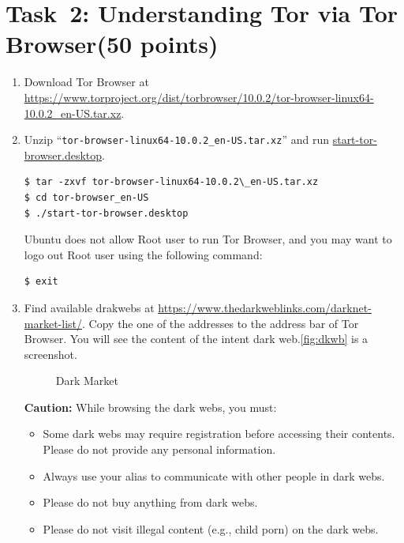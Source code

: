 \documentclass[11pt]{article}
\newcommand{\tor}{{\sf Tor}\xspace}
\newcommand{\torbw}{{\sf Tor Browser}\xspace}
\begin{document}
\section{Task~2: Understanding \tor via \torbw (50 points)} 
\begin{enumerate}
\item Download \torbw at \url{https://www.torproject.org/dist/torbrowser/10.0.2/tor-browser-linux64-10.0.2_en-US.tar.xz}.

\item Unzip ``\texttt{tor-browser-linux64-10.0.2\_en-US.tar.xz}'' and run \url{start-tor-browser.desktop}.
 \begin{lstlisting}
$ tar -zxvf tor-browser-linux64-10.0.2\_en-US.tar.xz
$ cd tor-browser_en-US
$ ./start-tor-browser.desktop
\end{lstlisting}\vspace{-6mm}
Ubuntu does not allow Root user to run \torbw, and you may want to logo out Root user using the following command: 
 \begin{lstlisting}
$ exit
\end{lstlisting}\vspace{-6mm}

\item Find available drakwebs at \url{https://www.thedarkweblinks.com/darknet-market-list/}. Copy the one of the addresses to the address bar of \torbw. You will see the content of the intent dark web.\autoref{fig:dkwb} is a screenshot. 

\begin{figure}[h]
\centering
{}
\caption{Dark Market}\label{fig:dkwb}
\end{figure}


\textbf{Caution:} While browsing the dark webs, you must:   
\begin{itemize}
\item Some dark webs may require registration before accessing their contents. Please do not provide any personal information. 
\item Always use your alias to communicate with other people in dark webs. 
\item Please do not buy anything from dark webs.
\item Please do not visit illegal content (e.g., child porn) on the dark webs.
\end{itemize}


\end{enumerate}
\end{document}
